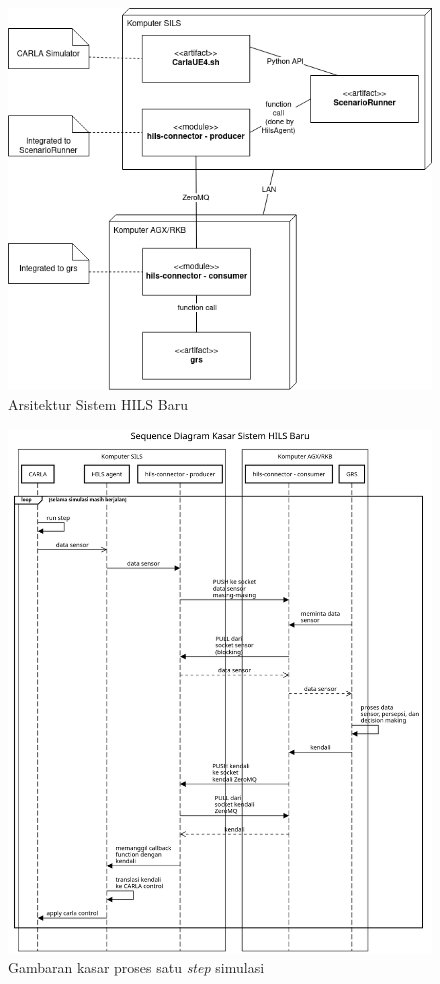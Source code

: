 \begin{figure}[!htbp]
	\centering
	\includegraphics[width=1.0\textwidth]{resources/chapter-3/deployment-diagram-new-hils.png}
	\caption{Arsitektur Sistem HILS Baru}
	\label{chapter-3-new-architecture}
\end{figure}

\begin{figure}[!htbp]
	\centering
	\includegraphics[width=1.0\textwidth]{resources/chapter-3/sequence-diagram-new-hils-kasar.png}
	\caption{Gambaran kasar proses satu \textit{step} simulasi}
	\label{chapter-3-new-sequence}
\end{figure}
